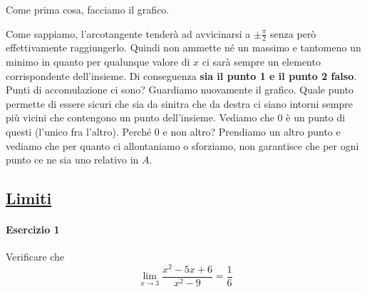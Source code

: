 Come prima cosa, facciamo il grafico.
\begin{center}
\end{center}
Come sappiamo, l'arcotangente tenderà ad avvicinarsi a $\pm\frac{\pi}{2}$ senza però effettivamente
raggiungerlo. Quindi non ammette né un massimo e tantomeno un minimo in quanto per qualunque valore
di $x$ ci sarà sempre un elemento corrispondente dell'insieme. Di conseguenza \textbf{sia il punto 1 
e il punto 2 falso}.\\
Punti di accomulazione ci sono? Guardiamo nuovamente il grafico. Quale punto permette di essere
sicuri che sia da sinitra che da destra ci siano intorni sempre più vicini che contengono un punto
dell'insieme. Vediamo che $0$ è un punto di questi (l'unico fra l'altro). Perché $0$ e non altro?
Prendiamo un altro punto e vediamo che per quanto ci allontaniamo o sforziamo, non garantisce che 
per	ogni punto ce ne sia uno relativo in $A$.

\subsection*{\hyperref[sec:limiti]{Limiti}}\label{ex:limiti}
\paragraph{Esercizio 1}
Verificare che
\begin{equation*}
\lim\limits_{x\to3}\frac{x^2-5x+6}{x^2-9}=\frac{1}{6}
\end{equation*}
\divisor

